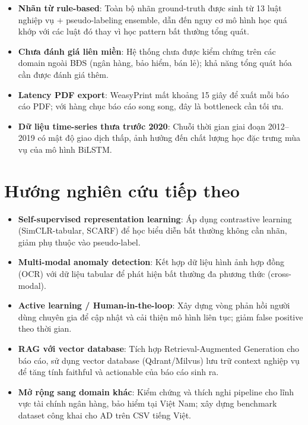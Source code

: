 \begin{itemize}
  \item \textbf{Nhãn từ rule-based}: Toàn bộ nhãn ground-truth được sinh từ 13 luật nghiệp vụ + pseudo-labeling ensemble, dẫn đến nguy cơ mô hình học quá khớp với các luật đó thay vì học pattern bất thường tổng quát.

  \item \textbf{Chưa đánh giá liên miền}: Hệ thống chưa được kiểm chứng trên các domain ngoài BĐS (ngân hàng, bảo hiểm, bán lẻ); khả năng tổng quát hóa cần được đánh giá thêm.

  \item \textbf{Latency PDF export}: WeasyPrint mất khoảng 15 giây để xuất mỗi báo cáo PDF; với hàng chục báo cáo song song, đây là bottleneck cần tối ưu.

  \item \textbf{Dữ liệu time-series thưa trước 2020}: Chuỗi thời gian giai đoạn 2012--2019 có mật độ giao dịch thấp, ảnh hưởng đến chất lượng học đặc trưng mùa vụ của mô hình BiLSTM.
\end{itemize}

\section*{Hướng nghiên cứu tiếp theo}

\begin{itemize}
  \item \textbf{Self-supervised representation learning}: Áp dụng contrastive learning (SimCLR-tabular, SCARF) để học biểu diễn bất thường không cần nhãn, giảm phụ thuộc vào pseudo-label.

  \item \textbf{Multi-modal anomaly detection}: Kết hợp dữ liệu hình ảnh hợp đồng (OCR) với dữ liệu tabular để phát hiện bất thường đa phương thức (cross-modal).

  \item \textbf{Active learning / Human-in-the-loop}: Xây dựng vòng phản hồi người dùng chuyên gia để cập nhật và cải thiện mô hình liên tục; giảm false positive theo thời gian.

  \item \textbf{RAG với vector database}: Tích hợp Retrieval-Augmented Generation cho báo cáo, sử dụng vector database (Qdrant/Milvus) lưu trữ context nghiệp vụ để tăng tính faithful và actionable của báo cáo sinh ra.

  \item \textbf{Mở rộng sang domain khác}: Kiểm chứng và thích nghi pipeline cho lĩnh vực tài chính ngân hàng, bảo hiểm tại Việt Nam; xây dựng benchmark dataset công khai cho AD trên CSV tiếng Việt.
\end{itemize}
